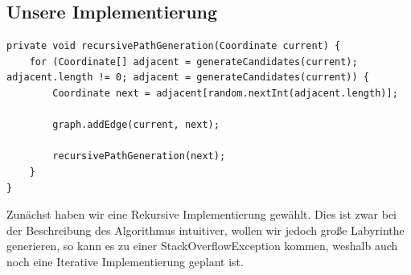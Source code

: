 \documentclass[12pt]{article}
\begin{document}
        \subsection{Unsere Implementierung}\label{subsec:unsere-implementierung}
            \begin{lstlisting}[label={lst:randomised-depth-first-search-code}, caption={Randomized-Depth-First-Search Implementierung}]
private void recursivePathGeneration(Coordinate current) {
    for (Coordinate[] adjacent = generateCandidates(current); adjacent.length != 0; adjacent = generateCandidates(current)) {
        Coordinate next = adjacent[random.nextInt(adjacent.length)];

        graph.addEdge(current, next);

        recursivePathGeneration(next);
    }
}
            \end{lstlisting}
            Zunächst haben wir eine Rekursive Implementierung gewählt.
            Dies ist zwar bei der Beschreibung des Algorithmus intuitiver, wollen wir jedoch große Labyrinthe generieren, so kann es zu einer StackOverflowException kommen, weshalb auch noch eine Iterative Implementierung geplant ist.
\end{document}
